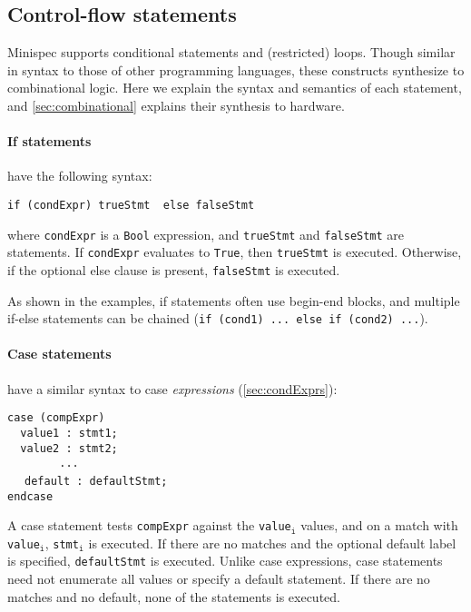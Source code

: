 
\subsection{Control-flow statements}

Minispec supports conditional statements and (restricted) loops.
Though similar in syntax to those of other programming languages,
these constructs synthesize to combinational logic.
Here we explain the syntax and semantics of each statement,
and \autoref{sec:combinational} explains their synthesis to hardware.

\paragraph{If statements} have the following syntax:
\begin{center}
\verb|if (condExpr) trueStmt |\optStart\verb| else falseStmt |\optEnd
\end{center}
where \verb|condExpr| is a \verb|Bool| expression, and \verb|trueStmt| and \verb|falseStmt| are statements.
If \verb|condExpr| evaluates to \verb|True|, then \verb|trueStmt| is executed.
Otherwise, if the optional else clause is present, \verb|falseStmt| is executed.

As shown in the examples, if statements often use begin-end blocks, and
multiple if-else statements can be chained (\verb|if (cond1) ... else if (cond2) ...|).

\paragraph{Case statements} have a similar syntax to case \emph{expressions} (\autoref{sec:condExprs}):
\begin{center}
\verb|case (compExpr)           | \\
\verb|  value1 : stmt1;         | \\
\verb|  value2 : stmt2;         | \\
\verb|        ...               | \\
\verb| | \optStart \verb| default : defaultStmt; |\optEnd \\
\verb|endcase                   |
\end{center}
A case statement tests \verb|compExpr| against the \verb|value|$_{\texttt{i}}$ values,
and on a match with \verb|value|$_{\texttt{i}}$, \verb|stmt|$_{\texttt{i}}$ is executed.
If there are no matches and the optional default label is specified, \verb|defaultStmt| is executed.
Unlike case expressions, case statements need not enumerate all values or specify a default statement.
If there are no matches and no default, none of the statements is executed.

